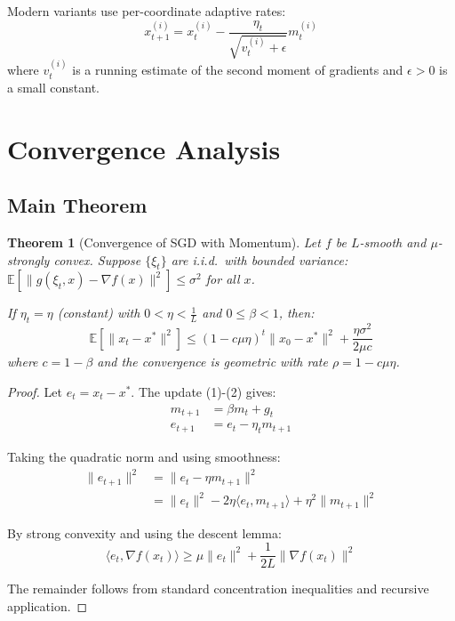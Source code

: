 \documentclass[11pt]{article}
\newtheorem{theorem}{Theorem}
\begin{document}
Modern variants use per-coordinate adaptive rates:
\begin{equation}
x_{t+1}^{(i)} = x_t^{(i)} - \frac{\eta_t}{\sqrt{v_t^{(i)} + \epsilon}} m_t^{(i)}
\end{equation}
where $v_t^{(i)}$ is a running estimate of the second moment of gradients and $\epsilon > 0$ is a small constant.

\section{Convergence Analysis}

\subsection{Main Theorem}

\begin{theorem}[Convergence of SGD with Momentum]
Let $f$ be $L$-smooth and $\mu$-strongly convex. Suppose $\{\xi_t\}$ are i.i.d.\
with bounded variance: $\mathbb{E}[\|g(\xi_t, x) - \nabla f(x)\|^2] \leq \sigma^2$ for all $x$.

If $\eta_t = \eta$ (constant) with $0 < \eta < \frac{1}{L}$ and $0 \leq \beta < 1$, then:
\begin{equation}
\mathbb{E}[\|x_t - x^*\|^2] \leq (1 - c \mu \eta)^t \|x_0 - x^*\|^2 + \frac{\eta \sigma^2}{2 \mu c}
\end{equation}
where $c = 1 - \beta$ and the convergence is geometric with rate $\rho = 1 - c \mu \eta$.
\end{theorem}

\begin{proof}
Let $e_t = x_t - x^*$. The update (1)-(2) gives:
\begin{align}
m_{t+1} &= \beta m_t + g_t \\
e_{t+1} &= e_t - \eta_t m_{t+1}
\end{align}

Taking the quadratic norm and using smoothness:
\begin{align}
\|e_{t+1}\|^2 &= \|e_t - \eta m_{t+1}\|^2 \\
&= \|e_t\|^2 - 2\eta \langle e_t, m_{t+1} \rangle + \eta^2 \|m_{t+1}\|^2
\end{align}

By strong convexity and using the descent lemma:
\begin{equation}
\langle e_t, \nabla f(x_t) \rangle \geq \mu \|e_t\|^2 + \frac{1}{2L} \|\nabla f(x_t)\|^2
\end{equation}

The remainder follows from standard concentration inequalities and recursive application.
\end{proof}
\end{document}
